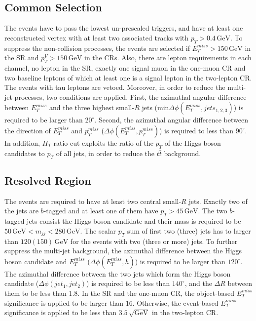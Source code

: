\documentclass[class=NTHU_thesis, crop=false]{standalone}
\begin{document}
\subsection{Common Selection}
The events have to pass the lowest un-prescaled triggers\cite{Lowest_un-prescaled_triggers}, and have at least one reconstructed vertex with at least two associated tracks with $p_T > 0.4\, \mathrm{GeV}$. To suppress the non-collision processes, the events are selected if $E^{miss}_T > 150\, \mathrm{GeV}$ in the SR and $p^V_T > 150\, \mathrm{GeV}$ in the CRs. Also, there are lepton requirements in each channel, no lepton in the SR, exactly one signal muon in the one-muon CR and two baseline leptons of which at least one is a signal lepton in the two-lepton CR. The events with tau leptons are vetoed. Moreover, in order to reduce the multi-jet processes, two conditions are applied. First, the azimuthal angular difference between $E^{miss}_T$ and the three highest small-$R$ jets (min$\Delta\phi(E^{miss}_T, jets_{1, 2, 3})$) is required to be larger than $20^\circ$. Second, the azimuthal angular difference between the direction of $E^{miss}_T$ and $p^{miss}_T$ ($\Delta\phi(E^{miss}_T, p^{miss}_T)$) is required to less than $90^\circ$. In addition, $H_T$ ratio cut\cite{Meehan:2225941} exploits the ratio of the $p_T$ of the Higgs boson candidates to $p_T$ of all jets, in order to reduce the $t\bar{t}$ background.

\subsection{Resolved Region}
The events are required to have at least two central small-$R$ jets. Exactly two of the jets are $b$-tagged and at least one of them have $p_T > 45\, \mathrm{GeV}$. The two $b$-tagged jets consist the Higgs boson candidate and their mass is required to be $50\, \mathrm{GeV} < m_{jj} < 280\, \mathrm{GeV}$. The scalar $p_T$ sum of first two (three) jets has to larger than $120 (150)\, \mathrm{GeV}$ for the events with two (three or more) jets. To further suppress the multi-jet background, the azimuthal difference between the Higgs boson candidate and $E^{miss}_T$ ($\Delta\phi(E^{miss}_T, h)$) is required to be larger than $120^\circ$. The azimuthal difference between the two jets which form the Higgs boson candidate ($\Delta\phi(jet_1, jet_2)$) is required to be less than $140^\circ$, and the ${\Delta}R$ between them to be less than $1.8$. In the SR and the one-muon CR, the object-based $E^{miss}_T$ significance is applied to be larger than $16$. Otherwise, the event-based $E^{miss}_T$ significance is applied to be less than $3.5\, \sqrt{\mathrm{GeV}}$ in the two-lepton CR.
\end{document}
